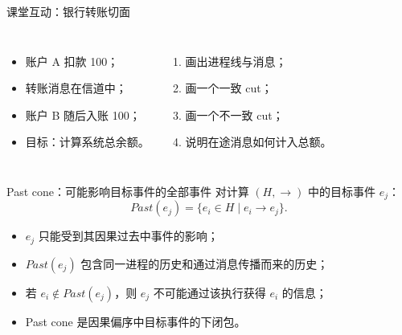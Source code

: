 \documentclass[UTF8,fontset=none,aspectratio=169,10pt]{beamer}
\begin{document}
\begin{frame}{课堂互动：银行转账切面}
\begin{columns}[T,onlytextwidth]
\begin{itemize}
  \item 账户 A 扣款 100；
  \item 转账消息在信道中；
  \item 账户 B 随后入账 100；
  \item 目标：计算系统总余额。
\end{itemize}
\begin{enumerate}
  \item 画出进程线与消息；
  \item 画一个一致 cut；
  \item 画一个不一致 cut；
  \item 说明在途消息如何计入总额。
\end{enumerate}
\end{columns}
\vfill
{}
\end{frame}


\begin{frame}{Past cone：可能影响目标事件的全部事件}
对计算 $(H,\rightarrow)$ 中的目标事件 $e_j$：
\[
Past(e_j)=\{e_i\in H\mid e_i\rightarrow e_j\}.
\]
\vfill
\begin{itemize}
  \item $e_j$ 只能受到其因果过去中事件的影响；
  \item $Past(e_j)$ 包含同一进程的历史和通过消息传播而来的历史；
  \item 若 $e_i\notin Past(e_j)$，则 $e_j$ 不可能通过该执行获得 $e_i$ 的信息；
  \item Past cone 是因果偏序中目标事件的下闭包。
\end{itemize}
\end{frame}
\end{document}
